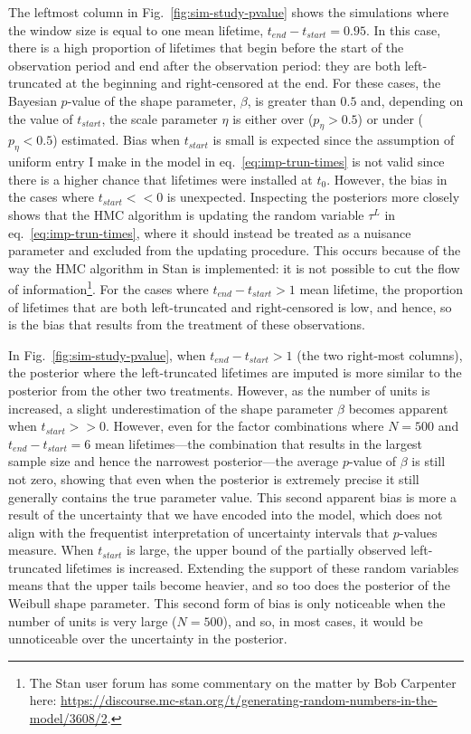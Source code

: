 The leftmost column in Fig.~\ref{fig:sim-study-pvalue} shows the simulations where the window size is equal to one mean lifetime, $t_{end} - t_{start} = 0.95$. In this case, there is a high proportion of lifetimes that begin before the start of the observation period and end after the observation period: they are both left-truncated at the beginning and right-censored at the end. For these cases, the Bayesian $p$-value of the shape parameter, $\beta$, is greater than $0.5$ and, depending on the value of $t_{start}$, the scale parameter $\eta$ is either over ($p_{\eta} > 0.5$) or under ($p_{\eta} < 0.5$) estimated. Bias when $t_{start}$ is small is expected since the assumption of uniform entry I make in the model in eq.~\eqref{eq:imp-trun-times} is not valid since there is a higher chance that lifetimes were installed at $t_0$. However, the bias in the cases where $t_{start} << 0$ is unexpected. Inspecting the posteriors more closely shows that the HMC algorithm is updating the random variable $\tau^L$ in eq.~\eqref{eq:imp-trun-times}, where it should instead be treated as a nuisance parameter and excluded from the updating procedure. This occurs because of the way the HMC algorithm in Stan is implemented: it is not possible to cut the flow of information\footnote{The Stan user forum has some commentary on the matter by Bob Carpenter here: \href{https://discourse.mc-stan.org/t/generating-random-numbers-in-the-model/3608/2}{https://discourse.mc-stan.org/t/generating-random-numbers-in-the-model/3608/2}.}. For the cases where $t_{end} - t_{start} > 1$ mean lifetime, the proportion of lifetimes that are both left-truncated and right-censored is low, and hence, so is the bias that results from the treatment of these observations. 

In Fig.~\ref{fig:sim-study-pvalue}, when $t_{end} - t_{start} > 1$ (the two right-most columns), the posterior where the left-truncated lifetimes are imputed is more similar to the posterior from the other two treatments. However, as the number of units is increased, a slight underestimation of the shape parameter $\beta$ becomes apparent when $t_{start} >> 0$. However, even for the factor combinations where $N = 500$ and $t_{end} - t_{start} = 6$ mean lifetimes---the combination that results in the largest sample size and hence the narrowest posterior---the average $p$-value of $\beta$ is still not zero, showing that even when the posterior is extremely precise it still generally contains the true parameter value. This second apparent bias is more a result of the uncertainty that we have encoded into the model, which does not align with the frequentist interpretation of uncertainty intervals that $p$-values measure. When $t_{start}$ is large, the upper bound of the partially observed left-truncated lifetimes is increased. Extending the support of these random variables means that the upper tails become heavier, and so too does the posterior of the Weibull shape parameter. This second form of bias is only noticeable when the number of units is very large ($N = 500$), and so, in most cases, it would be unnoticeable over the uncertainty in the posterior.

